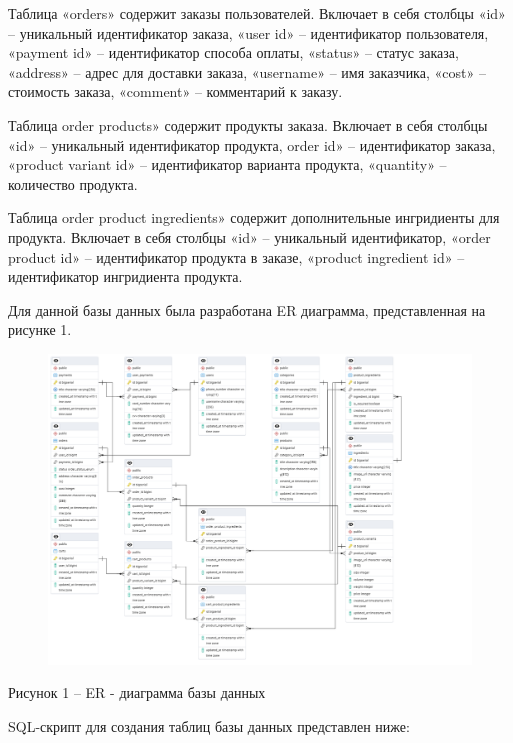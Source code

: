 \documentclass[a4paper,14pt]{extarticle}
\begin{document}
  Таблица «orders» содержит заказы пользователей. Включает в себя столбцы «id» -- уникальный идентификатор заказа, «user id» -- идентификатор пользователя, «payment id» -- идентификатор способа оплаты, «status» -- статус заказа, «address» -- адрес для доставки заказа, «username» -- имя заказчика, «cost» -- стоимость заказа, «comment» -- комментарий к заказу.

  Таблица order products» содержит продукты заказа. Включает в себя столбцы «id» -- уникальный идентификатор продукта, order id» -- идентификатор заказа, «product variant id» -- идентификатор варианта продукта, «quantity» -- количество продукта.

  Таблица order product ingredients» содержит дополнительные ингридиенты для продукта. Включает в себя столбцы «id» -- уникальный идентификатор, «order product id» -- идентификатор продукта в заказе, «product ingredient id» -- идентификатор ингридиента продукта.

  Для данной базы данных была разработана ER диаграмма, представленная на рисунке 1.

  \pagebreak
  \begin{figure}[h]
    \centering
    \includegraphics[width=1\linewidth]{img/er}
  \end{figure}
  \begin{center}
    Рисунок 1 – ER - диаграмма базы данных
  \end{center}

  SQL-скрипт для создания таблиц базы данных представлен ниже:
\end{document}
